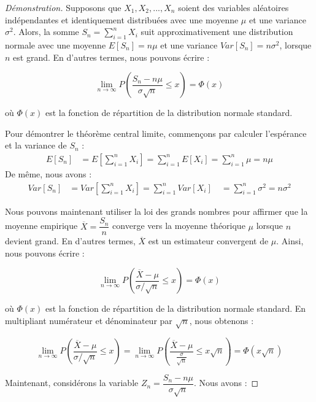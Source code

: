 \documentclass[a4paper]{article}
\newtheorem{proof}{Démonstration}
\begin{document}
\begin{proof}[Démonstration]
 
Supposons que $X_1, X_2, ..., X_n$ soient des variables aléatoires indépendantes et identiquement distribuées avec une moyenne $\mu$ et une variance $\sigma^2$. Alors, la somme $S_n = \sum_{i=1}^n X_i$ suit approximativement une distribution normale avec une moyenne $E[S_n] = n\mu$ et une variance $Var[S_n] = n\sigma^2$, lorsque $n$ est grand. En d'autres termes, nous pouvons écrire :

$$\lim_{n\rightarrow\infty} P\left(\frac{S_n - n\mu}{\sigma\sqrt{n}} \leq x\right) = \Phi(x)$$

où $\Phi(x)$ est la fonction de répartition de la distribution normale standard.

Pour démontrer le théorème central limite, commençons par calculer l'espérance et la variance de $S_n$ :
\begin{align*}
E[S_n] &= E\left[\sum_{i=1}^n X_i\right] = \sum_{i=1}^n E[X_i] = \sum_{i=1}^n \mu = n\mu
\end{align*}
De même, nous avons :
\begin{align*}
Var[S_n] &= Var\left[\sum_{i=1}^n X_i\right] = \sum_{i=1}^n Var[X_i] \quad = \sum_{i=1}^n \sigma^2 = n\sigma^2
\end{align*}

Nous pouvons maintenant utiliser la loi des grands nombres pour affirmer que la moyenne empirique $\overline{X} = \dfrac{S_n}{n}$ converge vers la moyenne théorique $\mu$ lorsque $n$ devient grand. En d'autres termes, $\overline{X}$ est un estimateur convergent de $\mu$. Ainsi, nous pouvons écrire :

$$\lim_{n\rightarrow\infty} P\left(\frac{\overline{X} - \mu}{\sigma/\sqrt{n}} \leq x\right) = \Phi(x)$$

où $\Phi(x)$ est la fonction de répartition de la distribution normale standard. En multipliant numérateur et dénominateur par $\sqrt{n}$, nous obtenons :

$$\lim_{n\rightarrow\infty} P\left(\frac{\overline{X} - \mu}{\sigma/\sqrt{n}} \leq x\right) = \lim_{n\rightarrow\infty} P\left(\frac{\overline{X} - \mu}{\frac{\sigma}{\sqrt{n}}} \leq x\sqrt{n}\right) = \Phi(x\sqrt{n})$$

Maintenant, considérons la variable $Z_n = \dfrac{S_n - n\mu}{\sigma\sqrt{n}}$. Nous avons :
\end{proof}
\end{document}
